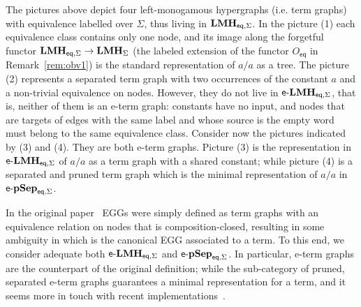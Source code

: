 \documentclass[3p]{elsarticle}
\newcommand{\eq}{\mathsf{eq}}
\newcommand{\catname}[1]{\textbf{\textup{#1}}}
\newcommand{\lmo}{\catname{LMH}}
\newcommand{\hyps}{\catname{Hyp}_{\Sigma}}
\newcommand{\Eqhyps}{\catname{Hyp}_{\mathsf{eq}, \Sigma}}
\newcommand{\lelmBis}{\mathsf{e}\text{-}\catname{LMH}_{\eq, \Sigma}}
\newcommand{\lepsBis}{\mathsf{e}\text{-}\catname{pSep}_{\eq, \Sigma}}
\theoremstyle{remark}
\theoremstyle{definition}
\begin{document}
\begin{center}
\end{center}

The pictures above depict four left-monogamous hypergraphs (i.e. term graphs) with equivalence
labelled over  $\Sigma$, thus living in $\lmo_{\eq, \Sigma}$.
%
In the picture (1) each equivalence class contains only one node, and its
image along the forgetful functor $\lmo_{\eq, \Sigma} \to \lmo_\Sigma$ 
(the labeled extension of the functor $O_{\eq}$ in Remark~\ref{rem:obv1}) 
is the standard representation of $a / a$ as a tree.
%
The picture (2) represents a separated term graph with two occurrences of the constant $a$ 
and a non-trivial equivalence on nodes.
However, they do not live in $\lelmBis$, that is, neither of them is an e-term graph:
constants have no input, and nodes that are targets of edges with the same label and whose source is the empty word 
must belong to the same equivalence class. 
%
Consider now the pictures indicated by (3) and (4). They are both e-term graphs. Picture (3) is 
the representation in $\lelmBis$ of $a / a$ as a term graph with a shared constant; while picture (4) is 
a separated and pruned term graph which is the minimal representation of $a / a$ in  $\lepsBis$.

In the original paper~\cite{DetlefsNS05} EGGs were simply defined as term graphs with an equivalence relation on nodes that is composition-closed, 
resulting in some ambiguity in which is the canonical EGG associated to a term. To this end, we consider adequate both $\lelmBis$ and $\lepsBis$.
In particular, e-term graphs are the counterpart of the original definition; while the sub-category of pruned, separated 
e-term graphs guarantees a minimal representation for a term, and it seems more in touch with recent implementations~\cite{eggs}.
\end{document}
